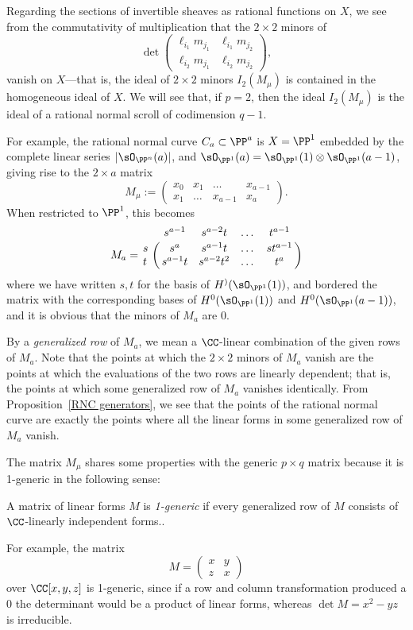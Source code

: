 Regarding the sections of invertible sheaves as rational functions on $X$, we see from the commutativity of
multiplication that the $2\times 2$ minors
of 
$$
\det \begin{pmatrix}
\ell_{i_1}m_{j_1} & \ell_{i_1}m_{j_2}\\
\ell_{i_2}m_{j_1} &\ell_{i_2}m_{j_2}  
\end{pmatrix},
$$
vanish on $X$---that is, the ideal of $2\times 2$ minors $I_2(M_\mu)$ is contained in the homogeneous ideal
of $X$. 
We will see that, if $p=2$, then the ideal $I_2(M_\mu)$
is the ideal of a rational normal scroll of codimension $q-1$.

For example, the rational normal curve $C_a\subset \PP^a$ is $X = \PP^1$ embedded by the complete
linear series $|\sO_{\PP^n}(a)|$, and $\sO_{\PP^1}(a) = \sO_{\PP^1}(1)\otimes \sO_{\PP^1}(a-1)$, 
giving rise to the $2\times a$ matrix
$$
M_\mu := 
\begin{pmatrix}
x_0&x_1&\dots&x_{a-1}\\
x_1&\dots&x_{a-1}&x_a
\end{pmatrix}.
$$
When restricted to $\PP^1$, this becomes
$$
M_a = \bordermatrix{
& s^{a-1}&s^{a-2}t&\dots&t^{a-1}\cr
s&  s^{a}& s^{a-1}t&\dots&st^{a-1}\cr
t&  s^{a-1}t& s^{a-2}t^{2}&\dots&t^{a}\cr
}$$
where we have written $s,t$ for the basis of $H^)(\sO_{\PP^1}(1))$, and bordered the matrix
with the corresponding bases of $H^0(\sO_{\PP^1}(1))$ and $H^0(\sO_{\PP^1}(a-1))$, and it is obvious
that the minors of $M_a$ are 0.

By a \emph{generalized row} of $M_{a}$, we mean a $\CC$-linear combination of the given rows of $M_{a}$. Note that the points at which the $2\times 2$ minors of $M_{a}$ vanish are the points at which the evaluations of the two rows are linearly dependent; that is, the points at which some
generalized row of $M_{a}$ vanishes identically. From Proposition~\ref{RNC generators}, we see that the points of the rational normal curve are exactly the points where all the linear forms in some generalized row
of $M_{a}$ vanish.


The matrix $M_{\mu}$ shares some properties with the generic $p\times q$ matrix because
it is 1-generic in the following sense:

\begin{definition}
 A matrix of linear forms $M$ is  \emph{1-generic} if every generalized row of $M$
 consists of $\CC$-linearly independent forms.. 
 \end{definition}

 For example, the matrix 
$$
M = \begin{pmatrix}
 x &y\\
 z&x
\end{pmatrix}
$$
over $\CC[x,y,z]$ is  1-generic, since if a row and column transformation produced a 0 the determinant would be a product of linear forms, whereas
$\det M = x^2-yz$ is irreducible. 

